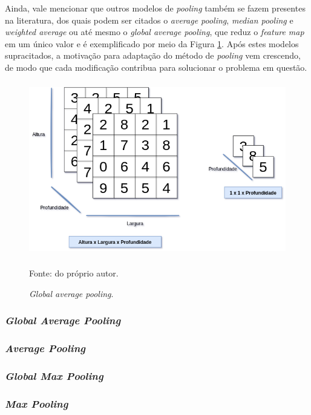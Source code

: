 \begin{sloppypar}
Ainda, vale mencionar que outros modelos de \textit{pooling} também se fazem presentes na literatura, dos quais podem ser citados o \textit{average pooling}, \textit{median pooling} e \textit{weighted average} \citep{Goodfellow2016} ou até mesmo o \textit{global average pooling}, que reduz o \textit{feature map} em um único valor e é exemplificado por meio da Figura \ref{cnn:fig:8}. Após estes modelos supracitados, a motivação para adaptação do método de \textit{pooling} vem crescendo, de modo que cada modificação contribua para solucionar o problema em questão.
\end{sloppypar}

\begin{figure}[H]
    \centering
    \caption{\textit{Global average pooling}.}
    \includegraphics[height=3in]{recursos/imagens/deep/global_average_pooling.png}
    \label{cnn:fig:8}

     Fonte: do próprio autor.
\end{figure}

\subsubsection{\textit{Global Average Pooling}}

\subsubsection{\textit{Average Pooling}}

\subsubsection{\textit{Global Max Pooling}}

\subsubsection{\textit{Max Pooling}}

